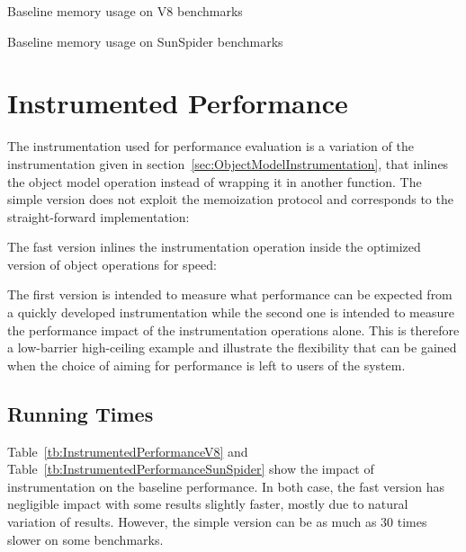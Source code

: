 \begin{table}[htb]
\caption{Baseline memory usage on V8 benchmarks}
\centering
    
\label{tb:BaselineMemoryV8}
\end{table}

\begin{table}[htb]
\caption{Baseline memory usage on SunSpider benchmarks}
\centering
    
\label{tb:BaselineMemorySunSpider}
\end{table}

\newpage
\section{Instrumented Performance}
\label{sec:InstrumentedPerformance}

The instrumentation used for performance evaluation is a variation of the
instrumentation given in section~\ref{sec:ObjectModelInstrumentation}, that
inlines the object model operation instead of wrapping it in another function. 
The simple version does not exploit the memoization protocol and
corresponds to the straight-forward implementation:


The fast version inlines the instrumentation operation inside the optimized
version of object operations for speed:

\newpage
{}



The first version is intended to measure what performance can be expected from a
quickly developed instrumentation while the second one is intended to measure
the performance impact of the instrumentation operations alone. This is
therefore a low-barrier high-ceiling example and illustrate the flexibility
that can be gained when the choice of aiming for performance is left to users
of the system.

\subsection{Running Times}

Table~\ref{tb:InstrumentedPerformanceV8} and
Table~\ref{tb:InstrumentedPerformanceSunSpider} show the impact of
instrumentation on the baseline performance. In both case, the fast version has
negligible impact with some results slightly faster, mostly due to natural
variation of results.  However, the simple version can be as much as 30 times
slower on some benchmarks.

